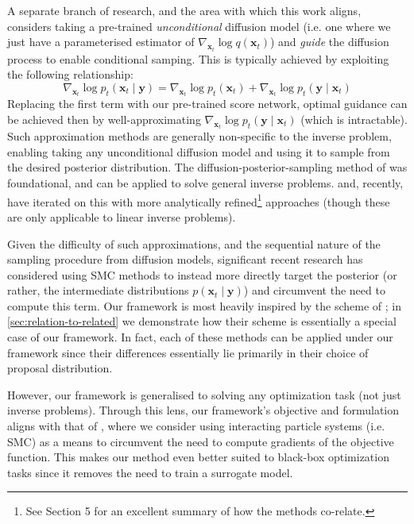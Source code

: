 A separate branch of research, and the area with which this work aligns, considers taking a pre-trained
\emph{unconditional} diffusion model (i.e. one where we just have a parameterised estimator of
$\nabla_{\mathbf{x}_t}\log q(\mathbf{x}_t)$) and \emph{guide} the diffusion process to enable
conditional samping. This is typically achieved by exploiting the following relationship:
\begin{equation}
    \nabla_{\mathbf{x}_t} \log p_t(\mathbf{x}_t \mid \mathbf{y}) = \nabla_{\mathbf{x}_t} \log p_t(\mathbf{x}_t) + \nabla_{\mathbf{x}_t}\log p_t(\mathbf{y} \mid \mathbf{x}_t) \label{eq:cond-score}
\end{equation}
Replacing the first term with our pre-trained score network, optimal guidance can be achieved then
by well-approximating $\nabla_{\mathbf{x}_t}\log p_t(\mathbf{y} \mid \mathbf{x}_t)$ (which is
intractable). Such approximation methods are generally non-specific to the inverse problem, enabling
taking any unconditional diffusion model and using it to sample from the desired posterior
distribution. The diffusion-posterior-sampling method of
\textcite{chungDiffusionPosteriorSampling2022} was foundational, and can be applied to solve general
inverse problems. \textcite{song2023pseudoinverseguided} and, recently,
\textcite{boysTweedieMomentProjected2023} have iterated on this with more analytically
refined\footnote{See \cite{boysTweedieMomentProjected2023} Section 5 for an excellent summary
of how the methods co-relate.}
approaches (though these are only applicable to linear inverse problems).

Given the difficulty of such approximations, and the sequential nature of the sampling procedure
from diffusion models, significant recent research
\parencite{cardosoMonteCarloGuided2023,trippeDiffusionProbabilisticModeling2023,
wuPracticalAsymptoticallyExact2023,douDiffusionPosteriorSampling2023,
janatiDivideandConquerPosteriorSampling2024} has considered using SMC methods to instead more
directly target the posterior (or rather, the intermediate distributions
$p(\mathbf{x}_t \mid \mathbf{y})$) and circumvent the need to compute this term. Our framework is
most heavily inspired by the scheme of \textcite{cardosoMonteCarloGuided2023}; in
\ref{sec:relation-to-related} we demonstrate how their scheme is essentially a special case of our
framework. In fact, each of these methods can be applied under our framework since their differences
essentially lie primarily in their choice of proposal distribution.

However, our framework is generalised to solving any optimization task (not just inverse problems).
Through this lens, our framework's objective and formulation aligns with that of
\cite{kongDiffusionModelsConstrained2024}, where we consider using interacting particle systems
(i.e. SMC) as a means to circumvent the need to compute gradients of the objective function. This
makes our method even better suited to black-box optimization tasks since it removes the need to
train a surrogate model.
